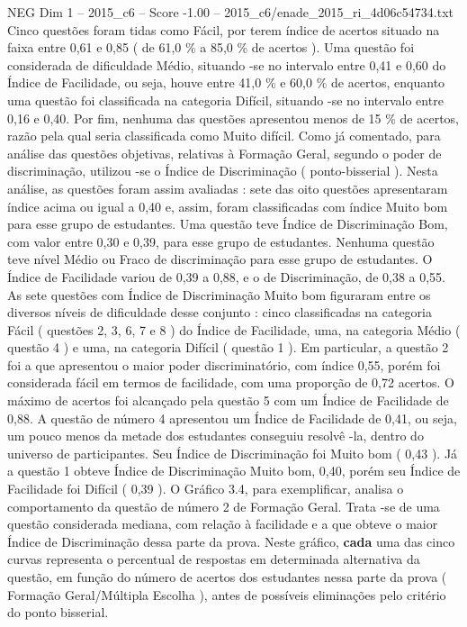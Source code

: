 \begin{textsample}{NEG Dim 1 – 2015\_c6 – Score -1.00 – 2015\_c6/enade\_2015\_ri\_4d06c54734.txt}
Cinco questões foram tidas como Fácil, por terem índice de acertos situado na faixa entre 0,61 e 0,85 ( de 61,0 \% a 85,0 \% de acertos ).
Uma questão foi considerada de dificuldade Médio, situando -se no intervalo entre 0,41 e 0,60 do Índice de Facilidade, ou seja, houve entre 41,0 \% e 60,0 \% de acertos, enquanto uma questão foi classificada na categoria Difícil, situando -se no intervalo entre 0,16 e 0,40.
Por fim, nenhuma das questões apresentou menos de 15 \% de acertos, razão pela qual seria classificada como Muito difícil.
Como já comentado, para análise das questões objetivas, relativas à Formação Geral, segundo o poder de discriminação, utilizou -se o Índice de Discriminação ( ponto-bisserial ).
Nesta análise, as questões foram assim avaliadas : sete das oito questões apresentaram índice acima ou igual a 0,40 e, assim, foram classificadas com índice Muito bom para esse grupo de estudantes.
Uma questão teve Índice de Discriminação Bom, com valor entre 0,30 e 0,39, para esse grupo de estudantes.
Nenhuma questão teve nível Médio ou Fraco de discriminação para esse grupo de estudantes.
O Índice de Facilidade variou de 0,39 a 0,88, e o de Discriminação, de 0,38 a 0,55.
As sete questões com Índice de Discriminação Muito bom figuraram entre os diversos níveis de dificuldade desse conjunto : cinco classificadas na categoria Fácil ( questões 2, 3, 6, 7 e 8 ) do Índice de Facilidade, uma, na categoria Médio ( questão 4 ) e uma, na categoria Difícil ( questão 1 ).
Em particular, a questão 2 foi a que apresentou o maior poder discriminatório, com índice 0,55, porém foi considerada fácil em termos de facilidade, com uma proporção de 0,72 acertos.
O máximo de acertos foi alcançado pela questão 5 com um Índice de Facilidade de 0,88.
A questão de número 4 apresentou um Índice de Facilidade de 0,41, ou seja, um pouco menos da metade dos estudantes conseguiu resolvê -la, dentro do universo de participantes.
Seu Índice de Discriminação foi Muito bom ( 0,43 ).
Já a questão 1 obteve Índice de Discriminação Muito bom, 0,40, porém seu Índice de Facilidade foi Difícil ( 0,39 ).
O Gráfico 3.4, para exemplificar, analisa o comportamento da questão de número 2 de Formação Geral.
Trata -se de uma questão considerada mediana, com relação à facilidade e a que obteve o maior Índice de Discriminação dessa parte da prova.
Neste gráfico, \textbf{cada} uma das cinco curvas representa o percentual de respostas em determinada alternativa da questão, em função do número de acertos dos estudantes nessa parte da prova ( Formação Geral/Múltipla Escolha ), antes de possíveis eliminações pelo critério do ponto bisserial.

\end{textsample}
